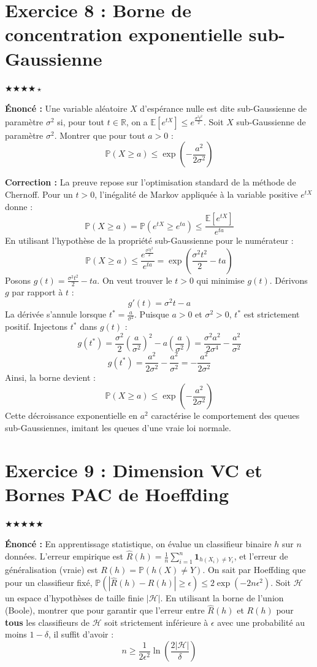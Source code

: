 \documentclass[11pt,a4paper]{article}
\begin{document}
\section*{Exercice 8 : Borne de concentration exponentielle sub-Gaussienne}

$\bigstar\bigstar\bigstar\bigstar\star$

\textbf{Énoncé :}
Une variable aléatoire $X$ d'espérance nulle est dite sub-Gaussienne de paramètre $\sigma^2$ si, pour tout $t \in \mathbb{R}$, on a $\mathbb{E}[e^{tX}] \le e^{\frac{\sigma^2 t^2}{2}}$.
Soit $X$ sub-Gaussienne de paramètre $\sigma^2$. Montrer que pour tout $a > 0$ :
$$ \mathbb{P}(X \ge a) \le \exp\left(-\frac{a^2}{2\sigma^2}\right) $$

\textbf{Correction :}
La preuve repose sur l'optimisation standard de la méthode de Chernoff.
Pour un $t > 0$, l'inégalité de Markov appliquée à la variable positive $e^{tX}$ donne :
$$ \mathbb{P}(X \ge a) = \mathbb{P}(e^{tX} \ge e^{ta}) \le \frac{\mathbb{E}[e^{tX}]}{e^{ta}} $$
En utilisant l'hypothèse de la propriété sub-Gaussienne pour le numérateur :
$$ \mathbb{P}(X \ge a) \le \frac{e^{\frac{\sigma^2 t^2}{2}}}{e^{ta}} = \exp\left( \frac{\sigma^2 t^2}{2} - ta \right) $$
Posons $g(t) = \frac{\sigma^2 t^2}{2} - ta$. On veut trouver le $t > 0$ qui minimise $g(t)$.
Dérivons $g$ par rapport à $t$ :
$$ g'(t) = \sigma^2 t - a $$
La dérivée s'annule lorsque $t^* = \frac{a}{\sigma^2}$. Puisque $a > 0$ et $\sigma^2 > 0$, $t^*$ est strictement positif.
Injectons $t^*$ dans $g(t)$ :
$$ g(t^*) = \frac{\sigma^2}{2} \left( \frac{a}{\sigma^2} \right)^2 - a \left( \frac{a}{\sigma^2} \right) = \frac{\sigma^2 a^2}{2 \sigma^4} - \frac{a^2}{\sigma^2} $$
$$ g(t^*) = \frac{a^2}{2 \sigma^2} - \frac{a^2}{\sigma^2} = - \frac{a^2}{2\sigma^2} $$
Ainsi, la borne devient :
$$ \mathbb{P}(X \ge a) \le \exp\left( -\frac{a^2}{2\sigma^2} \right) $$
Cette décroissance exponentielle en $a^2$ caractérise le comportement des queues sub-Gaussiennes, imitant les queues d'une vraie loi normale.


\section*{Exercice 9 : Dimension VC et Bornes PAC de Hoeffding}

$\bigstar\bigstar\bigstar\bigstar\bigstar$

\textbf{Énoncé :}
En apprentissage statistique, on évalue un classifieur binaire $h$ sur $n$ données. L'erreur empirique est $\hat{R}(h) = \frac{1}{n} \sum_{i=1}^n \mathbf{1}_{h(X_i) \neq Y_i}$, et l'erreur de généralisation (vraie) est $R(h) = \mathbb{P}(h(X) \neq Y)$.
On sait par Hoeffding que pour un classifieur fixé, $\mathbb{P}(|\hat{R}(h) - R(h)| \ge \epsilon) \le 2\exp(-2n\epsilon^2)$.
Soit $\mathcal{H}$ un espace d'hypothèses de taille finie $|\mathcal{H}|$.
En utilisant la borne de l'union (Boole), montrer que pour garantir que l'erreur entre $\hat{R}(h)$ et $R(h)$ pour \textbf{tous} les classifieurs de $\mathcal{H}$ soit strictement inférieure à $\epsilon$ avec une probabilité au moins $1 - \delta$, il suffit d'avoir :
$$ n \ge \frac{1}{2\epsilon^2} \ln\left(\frac{2|\mathcal{H}|}{\delta}\right) $$
\end{document}
